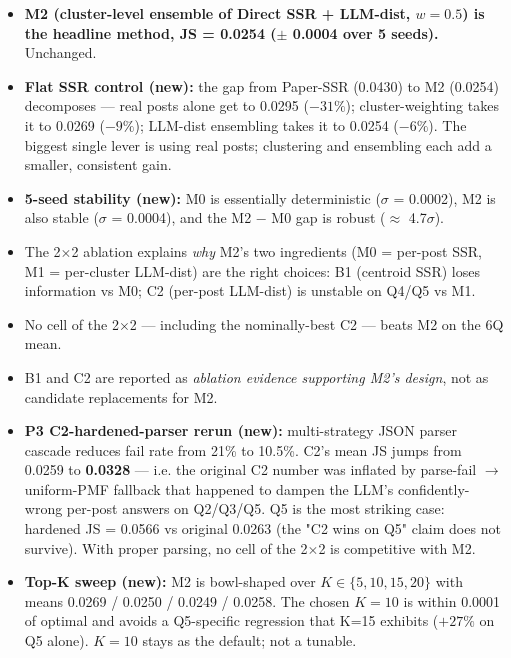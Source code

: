 \documentclass[10pt,a4paper]{article}
\begin{document}
\begin{itemize}[leftmargin=*,itemsep=2pt]
    \item \textbf{M2 (cluster-level ensemble of Direct SSR + LLM-dist, $w=0.5$) is the headline method, JS = 0.0254 ($\pm$ 0.0004 over 5 seeds).} Unchanged.
    \item \textbf{Flat SSR control (new):} the gap from Paper-SSR (0.0430) to M2 (0.0254) decomposes — real posts alone get to 0.0295 ($-31\%$); cluster-weighting takes it to 0.0269 ($-9\%$); LLM-dist ensembling takes it to 0.0254 ($-6\%$). The biggest single lever is using real posts; clustering and ensembling each add a smaller, consistent gain.
    \item \textbf{5-seed stability (new):} M0 is essentially deterministic ($\sigma$ = 0.0002), M2 is also stable ($\sigma$ = 0.0004), and the M2 $-$ M0 gap is robust ($\approx$ 4.7$\sigma$).
    \item The 2$\times$2 ablation explains \emph{why} M2's two ingredients (M0 = per-post SSR, M1 = per-cluster LLM-dist) are the right choices: B1 (centroid SSR) loses information vs M0; C2 (per-post LLM-dist) is unstable on Q4/Q5 vs M1.
    \item No cell of the 2$\times$2 — including the nominally-best C2 — beats M2 on the 6Q mean.
    \item B1 and C2 are reported as \emph{ablation evidence supporting M2's design}, not as candidate replacements for M2.
    \item \textbf{P3 C2-hardened-parser rerun (new):} multi-strategy JSON parser cascade reduces fail rate from 21\% to 10.5\%. C2's mean JS jumps from 0.0259 to \textbf{0.0328} — i.e. the original C2 number was inflated by parse-fail $\to$ uniform-PMF fallback that happened to dampen the LLM's confidently-wrong per-post answers on Q2/Q3/Q5. Q5 is the most striking case: hardened JS = 0.0566 vs original 0.0263 (the "C2 wins on Q5" claim does not survive). With proper parsing, no cell of the 2$\times$2 is competitive with M2.
    \item \textbf{Top-K sweep (new):} M2 is bowl-shaped over $K \in \{5, 10, 15, 20\}$ with means 0.0269 / 0.0250 / 0.0249 / 0.0258. The chosen $K=10$ is within 0.0001 of optimal and avoids a Q5-specific regression that K=15 exhibits ($+27\%$ on Q5 alone). $K=10$ stays as the default; not a tunable.
\end{itemize}
\end{document}

